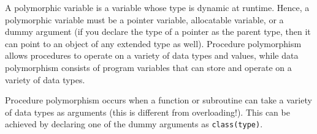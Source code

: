 \documentclass[10pt]{article}
\begin{document}
A polymorphic variable is a variable whose type is dynamic at runtime. Hence, a polymorphic variable must be a pointer variable, allocatable variable, or a dummy argument (if you declare the type of a pointer as the parent type, then it can point to an object of any extended type as well). Procedure polymorphism allows procedures to operate on a variety of data types and values, while data polymorphism consists of program variables that can store and operate on a variety of data types. 

Procedure polymorphism occurs when a function or subroutine can take a variety of data types as arguments (this is different from overloading!). This can be achieved by declaring one of the dummy arguments as {\tt class(type)}.
\end{document}
